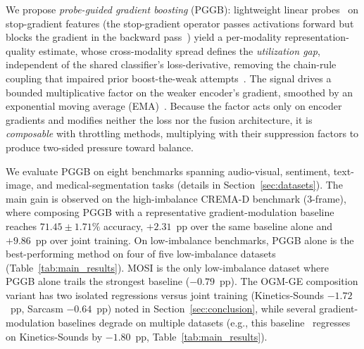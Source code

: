\documentclass{article}
\begin{document}
We propose \emph{probe-guided gradient boosting} (PGGB): lightweight linear probes~\citep{alain2017understanding} on stop-gradient features (the stop-gradient operator passes activations forward but blocks the gradient in the backward pass~\citep{vandenoord2017vqvae}) yield a per-modality representation-quality estimate, whose cross-modality spread defines the \emph{utilization gap}, independent of the shared classifier's loss-derivative, removing the chain-rule coupling that impaired prior boost-the-weak attempts~\citep{wei2024opm}. The signal drives a bounded multiplicative factor on the weaker encoder's gradient, smoothed by an exponential moving average (EMA)~\citep{tarvainen2017mean}. Because the factor acts only on encoder gradients and modifies neither the loss nor the fusion architecture, it is \emph{composable} with throttling methods, multiplying with their suppression factors to produce two-sided pressure toward balance.


We evaluate PGGB on eight benchmarks spanning audio-visual, sentiment, text-image, and medical-segmentation tasks (details in Section~\ref{sec:datasets}). The main gain is observed on the high-imbalance CREMA-D benchmark (3-frame), where composing PGGB with a representative gradient-modulation baseline~\citep{peng2022ogmge} reaches $71.45 \pm 1.71\%$ accuracy, $+2.31$~pp over the same baseline alone and $+9.86$~pp over joint training. On low-imbalance benchmarks, PGGB alone is the best-performing method on four of five low-imbalance datasets (Table~\ref{tab:main_results}). MOSI is the only low-imbalance dataset where PGGB alone trails the strongest baseline ($-0.79$~pp). The OGM-GE composition variant has two isolated regressions versus joint training (Kinetics-Sounds $-1.72$~pp, Sarcasm $-0.64$~pp) noted in Section~\ref{sec:conclusion}, while several gradient-modulation baselines degrade on multiple datasets (e.g., this baseline~\citep{peng2022ogmge} regresses on Kinetics-Sounds by $-1.80$~pp, Table~\ref{tab:main_results}).

\end{document}
